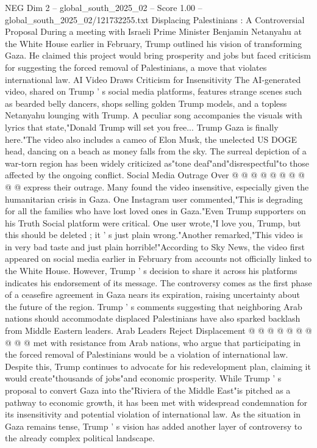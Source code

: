 \begin{textsample}{NEG Dim 2 – global\_south\_2025\_02 – Score 1.00 – global\_south\_2025\_02/121732255.txt}  \label{ex:f2_neg_068}
Displacing Palestinians : A Controversial Proposal During a meeting with Israeli Prime Minister Benjamin Netanyahu at the White House earlier in February, Trump outlined his vision of transforming Gaza.
He claimed this project would bring prosperity and jobs but faced criticism for suggesting the forced removal of Palestinians, a move that violates international law.
AI Video Draws Criticism for Insensitivity The AI-generated video, shared on Trump ' s social media platforms, features strange scenes such as bearded belly dancers, shops selling golden Trump models, and a topless Netanyahu lounging with Trump.
A peculiar song accompanies the visuals with lyrics that state,"Donald Trump will set you free...
Trump Gaza is finally here."The video also includes a cameo of Elon Musk, the unelected US DOGE head, dancing on a beach as money falls from the sky.
The surreal depiction of a war-torn region has been widely criticized as"tone deaf"and"disrespectful"to those affected by the ongoing conflict.
Social Media Outrage Over @ @ @ @ @ @ @ @ @ @ express their outrage.
Many found the video insensitive, especially given the humanitarian crisis in Gaza.
One Instagram user commented,"This is degrading for all the families who have lost loved ones in Gaza."Even Trump supporters on his Truth Social platform were critical.
One user wrote,"I love you, Trump, but this should be deleted ; it ' s just plain wrong."Another remarked,"This video is in very bad taste and just plain horrible!"According to Sky News, the video first appeared on social media earlier in February from accounts not officially linked to the White House.
However, Trump ' s decision to share it across his platforms indicates his endorsement of its message.
The controversy comes as the first phase of a ceasefire agreement in Gaza nears its expiration, raising uncertainty about the future of the region.
Trump ' s comments suggesting that neighboring Arab nations should accommodate displaced Palestinians have also sparked backlash from Middle Eastern leaders.
Arab Leaders Reject Displacement @ @ @ @ @ @ @ @ @ @ met with resistance from Arab nations, who argue that participating in the forced removal of Palestinians would be a violation of international law.
Despite this, Trump continues to advocate for his redevelopment plan, claiming it would create"thousands of jobs"and economic prosperity.
While Trump ' s proposal to convert Gaza into the"Riviera of the Middle East"is pitched as a pathway to economic growth, it has been met with widespread condemnation for its insensitivity and potential violation of international law.
As the situation in Gaza remains tense, Trump ' s vision has added another layer of controversy to the already complex political landscape.

\end{textsample}
